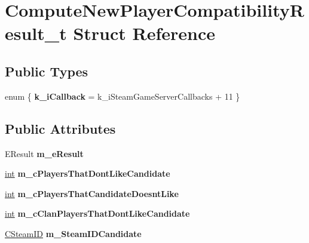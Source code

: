 \hypertarget{structComputeNewPlayerCompatibilityResult__t}{}\section{Compute\+New\+Player\+Compatibility\+Result\+\_\+t Struct Reference}
\label{structComputeNewPlayerCompatibilityResult__t}
\subsection*{Public Types}
\begin{DoxyCompactItemize}
\item 
\hypertarget{structComputeNewPlayerCompatibilityResult__t_a5825660aa8cc14af260cd0355cb24bb9}{}enum \{ {\bfseries k\+\_\+i\+Callback} = k\+\_\+i\+Steam\+Game\+Server\+Callbacks + 11
 \}\label{structComputeNewPlayerCompatibilityResult__t_a5825660aa8cc14af260cd0355cb24bb9}

\end{DoxyCompactItemize}
\subsection*{Public Attributes}
\begin{DoxyCompactItemize}
\item 
\hypertarget{structComputeNewPlayerCompatibilityResult__t_a5372994d1e83f4c0f6cfdf8540460c28}{}E\+Result {\bfseries m\+\_\+e\+Result}\label{structComputeNewPlayerCompatibilityResult__t_a5372994d1e83f4c0f6cfdf8540460c28}

\item 
\hypertarget{structComputeNewPlayerCompatibilityResult__t_a92ddef68c02bbca44089a55d3f377465}{}\hyperlink{SDL__thread_8h_a6a64f9be4433e4de6e2f2f548cf3c08e}{int} {\bfseries m\+\_\+c\+Players\+That\+Dont\+Like\+Candidate}\label{structComputeNewPlayerCompatibilityResult__t_a92ddef68c02bbca44089a55d3f377465}

\item 
\hypertarget{structComputeNewPlayerCompatibilityResult__t_a6cddd1f6d5a95d4c14d7da6d228d1d0f}{}\hyperlink{SDL__thread_8h_a6a64f9be4433e4de6e2f2f548cf3c08e}{int} {\bfseries m\+\_\+c\+Players\+That\+Candidate\+Doesnt\+Like}\label{structComputeNewPlayerCompatibilityResult__t_a6cddd1f6d5a95d4c14d7da6d228d1d0f}

\item 
\hypertarget{structComputeNewPlayerCompatibilityResult__t_a591103bb5d6e1464a2461cb1277512b6}{}\hyperlink{SDL__thread_8h_a6a64f9be4433e4de6e2f2f548cf3c08e}{int} {\bfseries m\+\_\+c\+Clan\+Players\+That\+Dont\+Like\+Candidate}\label{structComputeNewPlayerCompatibilityResult__t_a591103bb5d6e1464a2461cb1277512b6}

\item 
\hypertarget{structComputeNewPlayerCompatibilityResult__t_a10544387dc5fb054dd34f34cc11ceeef}{}\hyperlink{classCSteamID}{C\+Steam\+I\+D} {\bfseries m\+\_\+\+Steam\+I\+D\+Candidate}\label{structComputeNewPlayerCompatibilityResult__t_a10544387dc5fb054dd34f34cc11ceeef}

\end{DoxyCompactItemize}


